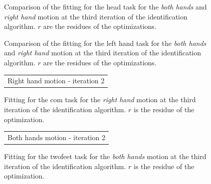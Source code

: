 \documentclass[letterpaper, 10pt, conference]{ieeeconf}      %
\begin{document}

\begin{figure}[t]
  \centering
\caption{Comparison of the fitting for the head task for the \emph{both hands} and \emph{right hand} motion at the third iteration of the identification algorithm.
$r$ are the residues of the optimizations.}
\label{fig:exp1:taskHead2}
\end{figure}

\begin{figure}[t]
  \centering
\caption{Comparison of the fitting for the left hand task for the \emph{both hands} and \emph{right hand} motion at the third iteration of the identification algorithm.
$r$ are the residues of the optimizations.}
\label{fig:exp1:taskLhand2}
\end{figure}

\begin{figure}[t]
  \centering
  \resizebox{.48\textwidth}{!} {
  \begin{tabular}{c}
	\\
  Right hand motion - iteration 2
  \end{tabular}
  }
\caption{Fitting for the com task for the \emph{right hand} motion at the third iteration of the identification algorithm.
$r$ is the residue of the optimization.}
\label{fig:exp1:taskCom2}
\end{figure}

\begin{figure}[t]
  \centering
  \resizebox{.48\textwidth}{!} {
  \begin{tabular}{c}
	\\
  Both hands motion - iteration 2
  \end{tabular}
    }
\caption{Fitting for the twofeet task for the \emph{both hands} motion at the third iteration of the identification algorithm.
$r$ is the residue of the optimization.}
\label{fig:exp1:taskTwofeet2}
\end{figure}
\end{document}
